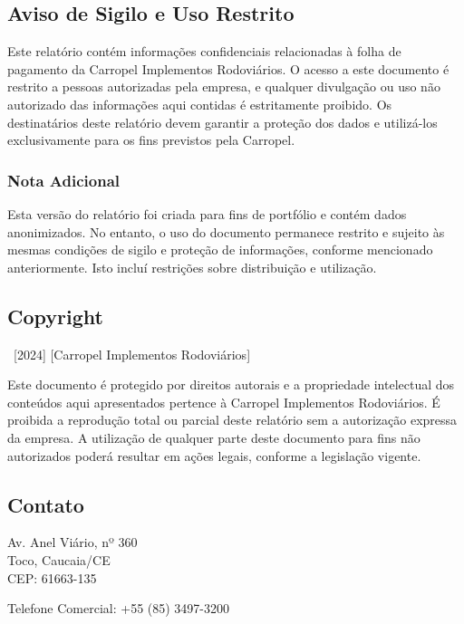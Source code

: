 \documentclass[a4paper, 12pt]{CSSullivanBusinessReport}
\begin{document}
\begin{twothirdswidth} 
	\footnotesize 
	
	\subsection*{Aviso de Sigilo e Uso Restrito}

Este relatório contém informações confidenciais relacionadas à folha de pagamento da Carropel Implementos Rodoviários. O acesso a este documento é restrito a pessoas autorizadas pela empresa, e qualquer divulgação ou uso não autorizado das informações aqui contidas é estritamente proibido. Os destinatários deste relatório devem garantir a proteção dos dados e utilizá-los exclusivamente para os fins previstos pela Carropel.

    \subsubsection*{Nota Adicional}

Esta versão do relatório foi criada para fins de portfólio e contém dados anonimizados. No entanto, o uso do documento permanece restrito e sujeito às mesmas condições de sigilo e proteção de informações, conforme mencionado anteriormente. Isto incluí restrições sobre distribuição e utilização.


	\subsection*{Copyright}
	
	\textcopyright~[2024] [Carropel Implementos Rodoviários] 
	
Este documento é protegido por direitos autorais e a propriedade intelectual dos conteúdos aqui apresentados pertence à Carropel Implementos Rodoviários. É proibida a reprodução total ou parcial deste relatório sem a autorização expressa da empresa. A utilização de qualquer parte deste documento para fins não autorizados poderá resultar em ações legais, conforme a legislação vigente.

	
	\subsection*{Contato}
	
	Av. Anel Viário, nº 360\\
	Toco, Caucaia/CE\\
	CEP: 61663-135

	Telefone Comercial: +55 (85) 3497-3200 
	

\end{twothirdswidth}
\end{document}
